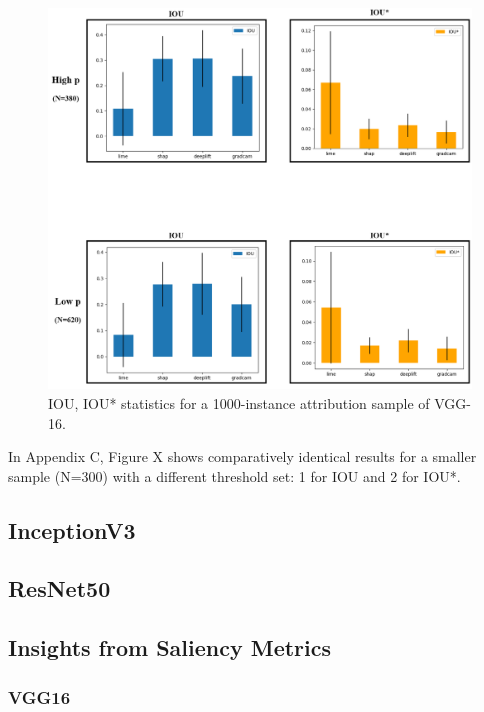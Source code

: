 \documentclass[main]{subfiles}
\begin{document}
\begin{figure}[h]\centering
\vfill
\includegraphics[scale=0.32]{vgg_0_5_and_1.png}
\caption{IOU, IOU* statistics for a 1000-instance attribution sample of VGG-16. }
\label{vggAfig}
\vfill
\end{figure}

In Appendix C, Figure X shows comparatively identical results for a smaller sample (N=300) with a different threshold set: 1 for IOU and 2 for IOU*.

\newpage



\subsection{InceptionV3}




\subsection{ResNet50}


\newpage
\subsection{Insights from Saliency Metrics} \label{sec:saliency_insights}

\subsubsection{VGG16}
\end{document}
